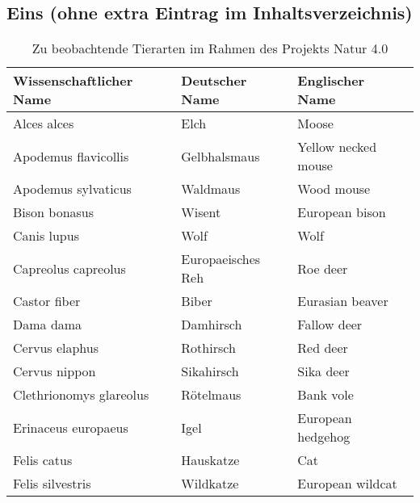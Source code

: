 \chapter{\appendixname}

\section*{Eins (ohne extra Eintrag im Inhaltsverzeichnis)}

\begin{table}[!ht]
	\centering
	\caption{Zu beobachtende Tierarten im Rahmen des Projekts Natur 4.0}
	\label{table:photosenseSpecies}
	\begin{tabular}{l|ll}
		\textbf{Wissenschaftlicher Name}  & \textbf{Deutscher Name}              & \textbf{Englischer Name}       \\
		\hline
		Alces alces              & Elch                        & Moose                 \\
		Apodemus flavicollis     & Gelbhalsmaus                & Yellow necked mouse   \\
		Apodemus sylvaticus      & Waldmaus                    & Wood mouse            \\
		Bison bonasus            & Wisent                      & European bison        \\
		Canis lupus              & Wolf                        & Wolf                  \\
		\hline
		Capreolus capreolus      & Europaeisches Reh           & Roe deer              \\
		Castor fiber             & Biber                       & Eurasian beaver       \\
		Dama dama                & Damhirsch                   & Fallow deer           \\
		Cervus elaphus           & Rothirsch                   & Red deer              \\
		Cervus nippon            & Sikahirsch                  & Sika deer             \\
		\hline
		Clethrionomys glareolus  & Rötelmaus                   & Bank vole             \\
		Erinaceus europaeus      & Igel                        & European hedgehog     \\
		Felis catus              & Hauskatze                   & Cat                   \\
		Felis silvestris         & Wildkatze                   & European wildcat      \\

\end{tabular}
\end{table}
